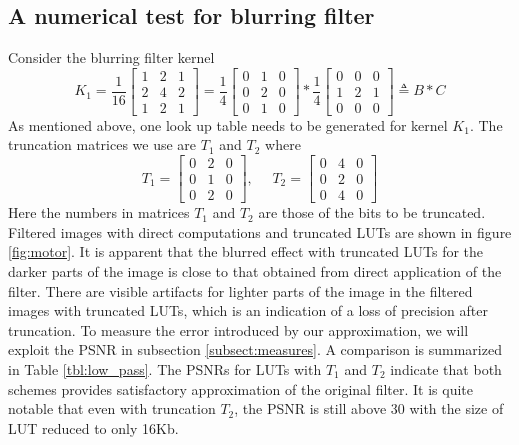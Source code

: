 \documentclass[12pt]{amsart}
\theoremstyle{definition}
\theoremstyle{remark}
\numberwithin{thm}{section}
\begin{document}
\subsection{A numerical test for blurring filter}\label{subsection:numerical_test_lowpass}
Consider the blurring filter kernel 
$$
K_1=\frac{1}{16}
\begin{bmatrix}
1 & 2 & 1\\
2 & 4 & 2\\
1 & 2 & 1
\end{bmatrix}
=
\frac{1}{4}
\begin{bmatrix}
0 & 1 & 0\\
0 & 2 & 0\\
0 & 1 & 0
\end{bmatrix}*\frac{1}{4}
\begin{bmatrix}
0 & 0 & 0\\
1 & 2 & 1\\
0 & 0 & 0
\end{bmatrix}\triangleq B*C
$$
As mentioned above, one look up table needs to be generated for kernel $K_1$. The truncation matrices we use are $T_1$ and $T_2$ where
$$
T_1=
\begin{bmatrix}
0 & 2 & 0\\
0 & 1 & 0\\
0 & 2 & 0
\end{bmatrix}
,\ \ \ \ \ \ T_2=
\begin{bmatrix}
0 & 4 & 0\\
0 & 2 & 0\\
0 & 4 & 0
\end{bmatrix}
$$
Here the numbers in matrices $T_1$ and $T_2$ are those of the bits to be truncated. Filtered images with direct computations and truncated LUTs are shown in figure \ref{fig:motor}. It is apparent that the blurred effect with truncated LUTs for the darker parts of the image is close to that obtained from direct application of the filter. There are visible artifacts for lighter parts of the image in the filtered images with truncated LUTs, which is an indication of a loss of precision after truncation. To measure the error introduced by our approximation, we will exploit the PSNR in subsection \ref{subsect:measures}. A comparison is summarized in Table \ref{tbl:low_pass}. The PSNRs for LUTs with $T_1$ and $T_2$ indicate that both schemes provides satisfactory approximation of the original filter. It is quite notable that even with truncation $T_2$, the PSNR is still above 30 with the size of LUT reduced to only 16Kb. 
\end{document}
